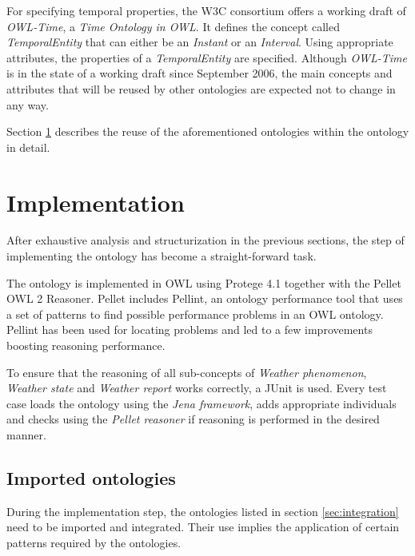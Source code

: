 For specifying temporal properties, the W3C consortium offers a working draft of \emph{OWL-Time}, a \emph{Time Ontology in OWL}. It defines the concept called \emph{TemporalEntity} that can either be an \emph{Instant} or an \emph{Interval}. Using appropriate attributes, the properties of a \emph{TemporalEntity} are specified. Although \emph{OWL-Time} is in the state of a working draft since September 2006, the main concepts and attributes that will be reused by other ontologies are expected not to change in any way.


Section \ref{sec:implementation} describes the reuse of the aforementioned ontologies within the \thinkhomeweather ontology in detail.

\section{Implementation}
\label{sec:implementation}

After exhaustive analysis and structurization in the previous sections, the step of implementing the ontology has become a straight-forward task.

The \thinkhomeweather ontology is implemented in OWL using Protege 4.1 together with the Pellet OWL 2 Reasoner. Pellet includes Pellint, an ontology performance tool that uses a set of patterns to find possible performance problems in an OWL ontology. Pellint has been used for locating problems and led to a few improvements boosting reasoning performance.

To ensure that the reasoning of all sub-concepts of \emph{Weather phenomenon}, \emph{Weather state} and \emph{Weather report} works correctly, a JUnit is used. Every test case loads the \thinkhomeweather ontology using the \emph{Jena framework}, adds appropriate individuals and checks using the \emph{Pellet reasoner} if reasoning is performed in the desired manner.

\subsection{Imported ontologies}

During the implementation step, the ontologies listed in section \ref{sec:integration} need to be imported and integrated. Their use implies the application of certain patterns required by the ontologies.

